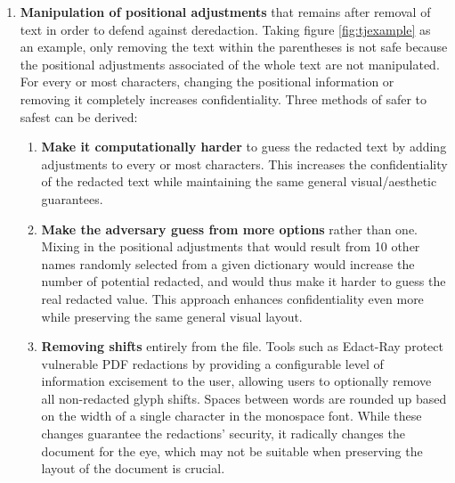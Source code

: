 \begin{enumerate}
    \item \label{posadj} \textbf{Manipulation of positional adjustments} that remains after removal of text in order to defend against deredaction. Taking figure \ref{fig:tjexample} as an example, only removing the text within the parentheses is not safe because the positional adjustments associated of the whole text are not manipulated. For every or most characters, changing the positional information or removing it completely increases confidentiality. Three methods of safer to safest can be derived:
        \begin{enumerate}
            \item \textbf{Make it computationally harder} to guess the redacted text by adding adjustments to every or most characters. This increases the confidentiality of the redacted text while maintaining the same general visual/aesthetic guarantees. 
            \item \label{b} \textbf{Make the adversary guess from more options} rather than one. Mixing in the positional adjustments that would result from 10 other names randomly selected from a given dictionary would increase the number of potential redacted, and would thus make it harder to guess the real redacted value. This approach enhances confidentiality even more while preserving the same general visual layout.
            \item \label{c} \textbf{Removing shifts} entirely from the file. Tools such as Edact-Ray protect vulnerable PDF redactions by providing a configurable level of information excisement to the user, allowing users to optionally remove all non-redacted glyph shifts. Spaces between words are rounded up based on the width of a single character in the monospace font. While these changes guarantee the redactions’ security, it radically changes the document for the eye, which may not be suitable when preserving the layout of the document is crucial.
        \end{enumerate}


\end{enumerate}
